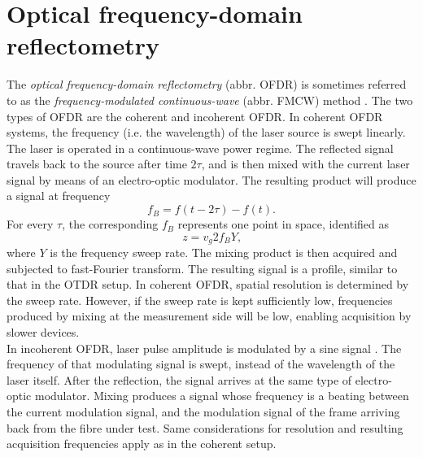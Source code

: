 \documentclass{standalone}
\begin{document}
\section{Optical frequency-domain reflectometry}

The \textit{optical frequency-domain reflectometry} (abbr. OFDR) is sometimes referred to as the \textit{frequency-modulated continuous-wave} (abbr. FMCW) method \cite{Farahani1999}\cite{Hartog2017}. The two types of OFDR are the coherent and incoherent OFDR. In coherent OFDR systems, the frequency (i.e. the wavelength) of the laser source is swept linearly. The laser is operated in a continuous-wave power regime. The reflected signal travels back to the source after time $2 \tau$, and is then mixed with the current laser signal by means of an electro-optic modulator. The resulting product will produce a signal at frequency
\begin{equation}
f_B = f(t - 2 \tau) - f(t) \textrm{.}
\end{equation}
For every $\tau$, the corresponding $f_B$ represents one point in space, identified as
\begin{equation}
z = v_g 2 f_B Y \textrm{,}
\end{equation}
where $Y$ is the frequency sweep rate. The mixing product is then acquired and subjected to fast-Fourier transform. The resulting signal is a profile, similar to that in the OTDR setup. In coherent OFDR, spatial resolution is determined by the sweep rate. However, if the sweep rate is kept sufficiently low, frequencies produced by mixing at the measurement side will be low, enabling acquisition by slower devices. \\

In incoherent OFDR, laser pulse amplitude is modulated by a sine signal \cite{emir}. The frequency of that modulating signal is swept, instead of the wavelength of the laser itself. After the reflection, the signal arrives at the same type of electro-optic modulator. Mixing produces a signal whose frequency is a beating between the current modulation signal, and the modulation signal of the frame arriving back from the fibre under test. Same considerations for resolution and resulting acquisition frequencies apply as in the coherent setup. \\
\end{document}
